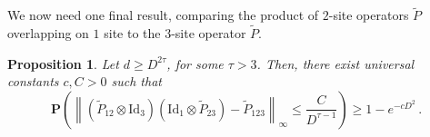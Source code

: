 \documentclass{amsart}
\newtheorem{proposition}[theorem]{Proposition}
\newcommand{\C}{\mathbf{C}}
\renewcommand{\P}{\mathbf{P}}
\renewcommand{\leq}{\leqslant}
\renewcommand{\geq}{\geqslant}
\newcommand{\Id}{\mathrm{Id}}
\begin{document}
We now need one final result, comparing the product of $2$-site operators $\widetilde{P}$ overlapping on $1$ site to the $3$-site operator $\widetilde{P}$.

\begin{proposition} \label{prop:P-commute}
    Let $d\geq D^{2\tau}$, for some $\tau>3$. Then, there exist universal constants $c,C>0$ such that
    \[ \P\left( \left\| \left(\widetilde{P}_{12}\otimes\Id_3\right) \left(\Id_1\otimes\widetilde{P}_{23}\right) - \widetilde{P}_{123} \right\|_{\infty} \leq \frac{C}{D^{\tau-1}} \right) \geq 1-e^{-cD^2} \, . \]
\end{proposition}
\end{document}
